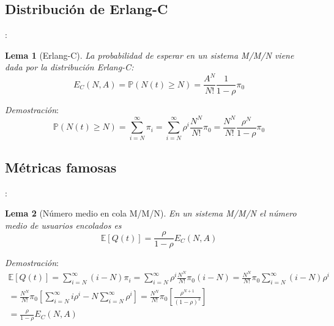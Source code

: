 \documentclass[xcolor={x11names}]{beamer}
\newtheorem{lema}{Lema}[section]
\begin{document}
\subsection{Distribución de Erlang-C}
\begin{frame}{\secname: \subsecname}
    \begin{lema}[Erlang-C]
        La probabilidad de esperar en un
        sistema M/M/N viene dada por
        la distribución Erlang-C:
        \begin{equation}
            E_C(N,A)=\mathbb{P}(N(t)\geq N)
            = \frac{A^N}{N!}\frac{1}{1-\rho}\pi_0
        \end{equation}
    \end{lema}
    \begin{figure}
        \resizebox{!}{.2\textwidth}{%
            
        }
    \end{figure}
    \vfill
    \textit{Demostración}:
        \begin{equation}
            \mathbb{P}(N(t)\geq N)=
            \sum_{i=N}^{\infty}\pi_i
            = \sum_{i=N}^{\infty}
            \rho^i \frac{N^N}{N!}\pi_0
            = \frac{N^N}{N!}\frac{\rho^N}{1-\rho}\pi_0
        \end{equation}
\end{frame}




\subsection{Métricas famosas}
\begin{frame}{\secname: \subsecname}
    \begin{lema}[Número medio en cola M/M/N]
        En un sistema M/M/N el número medio
        de usuarios encolados es
        \begin{equation}
            \mathbb{E}[Q(t)]=
            \frac{\rho}{1-\rho}
            E_C(N,A)
        \end{equation}
    \end{lema}
    \vfill
    \textit{Demostración}:
    \begin{multline*}
        \mathbb{E}[Q(t)]=\sum_{i=N}^\infty
        (i-N)\pi_i=
        \sum_{i=N}^\infty \rho^i \frac{N^N}{N!}
        \pi_0(i-N)=
        \frac{N^N}{N!}\pi_0
        \sum_{i=N}^\infty(i-N)\rho^i\\
        = 
        \frac{N^N}{N!}\pi_0
        \left[
            \sum_{i=N}^\infty
            i\rho^i - N\sum_{i=N}^\infty
            \rho^i
        \right]
        = 
        \frac{N^N}{N!}\pi_0
        \left[
            \frac{\rho^{N+1}}{(1-\rho)^2}
        \right]\\
        = \frac{\rho}{1-\rho}E_C(N,A)
    \end{multline*}
\end{frame}
\end{document}
